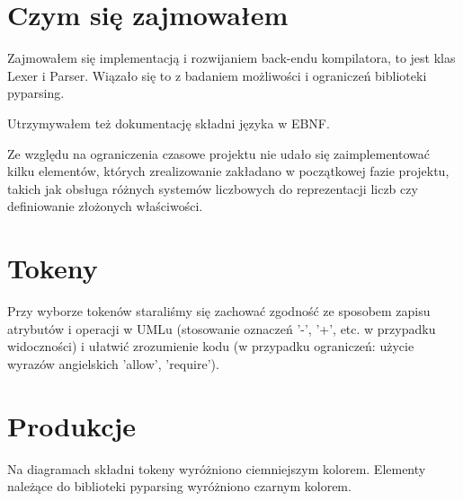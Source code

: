 \section{Czym się zajmowałem}
Zajmowałem się implementacją i rozwijaniem back-endu kompilatora, to jest klas Lexer i Parser. Wiązało się to z badaniem możliwości i ograniczeń biblioteki pyparsing.

Utrzymywałem też dokumentację składni języka w EBNF.

Ze względu na ograniczenia czasowe projektu nie udało się zaimplementować kilku elementów, których zrealizowanie zakładano w początkowej fazie projektu, takich jak obsługa różnych systemów liczbowych do reprezentacji liczb czy definiowanie złożonych właściwości.

\section{Tokeny}
Przy wyborze tokenów staraliśmy się zachować zgodność ze sposobem zapisu atrybutów i operacji w UMLu (stosowanie oznaczeń '-', '+', etc. w przypadku widoczności) i ułatwić zrozumienie kodu (w przypadku ograniczeń: użycie wyrazów angielskich 'allow', 'require').


\section{Produkcje}
Na diagramach składni tokeny wyróżniono ciemniejszym kolorem. Elementy należące do biblioteki pyparsing wyróżniono czarnym kolorem.

